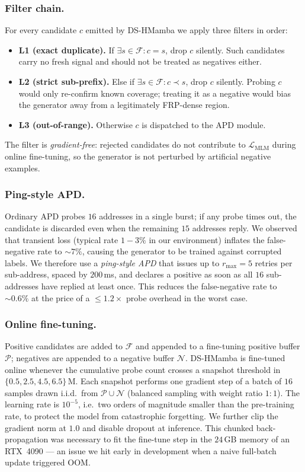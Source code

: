 \documentclass[conference]{IEEEtran}
\begin{document}
\subsubsection{Filter chain.}
For every candidate $c$ emitted by DS-HMamba we apply three
filters in order:
\begin{itemize}
   \item \textbf{L1 (exact duplicate).}  If $\exists s\in
   \mathcal{F}: c\!=\!s$, drop $c$ silently.  Such candidates
   carry no fresh signal and should not be treated as
   negatives either.
   \item \textbf{L2 (strict sub-prefix).}  Else if $\exists s\in
   \mathcal{F}: c\!\prec\!s$, drop $c$ silently.  Probing $c$
   would only re-confirm known coverage; treating it as a
   negative would bias the generator away from a legitimately
   FRP-dense region.
   \item \textbf{L3 (out-of-range).}  Otherwise $c$ is dispatched
   to the APD module.
\end{itemize}
The filter is \emph{gradient-free}: rejected candidates do not
contribute to $\mathcal{L}_{\mathrm{MLM}}$ during online
fine-tuning, so the generator is not perturbed by artificial
negative examples.

\subsubsection{Ping-style APD.}
Ordinary APD probes $16$ addresses in a single burst; if any
probe times out, the candidate is discarded even when the
remaining $15$ addresses reply.  We observed that transient
loss (typical rate $1\!-\!3\%$ in our environment) inflates the
false-negative rate to $\sim\!7\%$, causing the generator to
be trained against corrupted labels.  We therefore use a
\emph{ping-style APD} that issues up to $r_{\max}\!=\!5$
retries per sub-address, spaced by $200$\,ms, and declares a
positive as soon as all $16$ sub-addresses have replied at
least once.  This reduces the false-negative rate to
$\sim\!0.6\%$ at the price of a $\le\!1.2\times$ probe overhead
in the worst case.

\subsubsection{Online fine-tuning.}
Positive candidates are added to $\mathcal{F}$ and appended to
a fine-tuning positive buffer $\mathcal{P}$; negatives are
appended to a negative buffer $\mathcal{N}$.  DS-HMamba is
fine-tuned online whenever the cumulative probe count crosses
a snapshot threshold in $\{0.5,2.5,4.5,6.5\}$\,M.  Each
snapshot performs one gradient step of a batch of $16$ samples
drawn i.i.d.\ from $\mathcal{P}\!\cup\!\mathcal{N}$ (balanced
sampling with weight ratio $1{:}1$).  The learning rate is
$10^{-5}$, i.e.\ two orders of magnitude smaller than the
pre-training rate, to protect the model from catastrophic
forgetting.  We further clip the gradient norm at $1.0$ and
disable dropout at inference.  This chunked back-propagation
was necessary to fit the fine-tune step in the $24$\,GB memory
of an RTX~4090 --- an issue we hit early in development when a
naive full-batch update triggered OOM.
\end{document}

